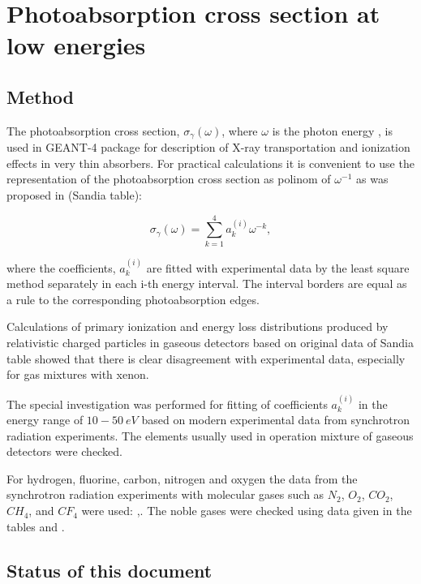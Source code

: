\chapter[Photoabsorption cross section at low energies]
{Photoabsorption cross section at low energies}

\section{Method}


The photoabsorption cross section, 
$\sigma_{\gamma}(\omega)$, where $\omega$ is the photon energy , is used in
GEANT-4 package for description of X-ray transportation and ionization effects in
very thin absorbers.
For practical calculations it is convenient to use the 
representation of the photoabsorption cross section as polinom of $\omega^{-1}$ as
was proposed in \cite{sandia}(Sandia table):

\[
\sigma_{\gamma}(\omega) = \sum_{k=1}^{4}a_{k}^{(i)}\omega^{-k} ,
\]

where the coefficients, $a_{k}^{(i)}$ are fitted with experimental data by the
least square method separately in each i-th energy interval. The interval borders
are equal as a rule to the corresponding photoabsorption edges.

Calculations of primary ionization and energy loss distributions produced by
relativistic charged particles in gaseous detectors based on original data
of Sandia table showed that there is clear disagreement with experimental data, 
 especially for gas mixtures with xenon.

The special investigation was performed \cite{grich} for fitting of coefficients 
$a_{k}^{(i)}$  in the energy range of $ 10 - 50 \ eV$ based on modern experimental
data from synchrotron radiation experiments. The elements usually used in
operation mixture of gaseous detectors were checked.

For hydrogen, fluorine, carbon, nitrogen and oxygen the data from the synchrotron
radiation experiments with molecular gases such as $N_2$, $O_2$, $CO_2$, 
 $CH_4$, and $CF_4$ were used: \cite{lee73},\cite{lee77}. The noble gases were
checked using data given in the tables \cite{marr} and \cite{west}.



\section{Status of  this document}

